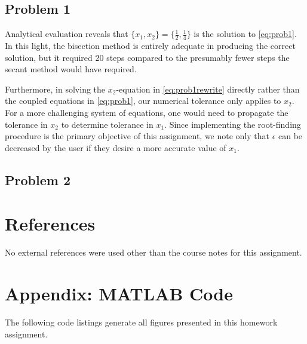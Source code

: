 \documentclass[12pt]{article}
\begin{document}
\subsection{Problem 1}

Analytical evaluation reveals that $\{ x_1, x_2 \} = \{ \tfrac{1}{2}, \tfrac{1}{4} \}$ is the solution to \eqref{eq:prob1}. In this light, the bisection method is entirely adequate in producing the correct solution, but it required 20 steps compared to the presumably fewer steps the secant method would have required.

Furthermore, in solving the $x_2$-equation in \eqref{eq:prob1rewrite} directly rather than the coupled equations in \eqref{eq:prob1}, our numerical tolerance only applies to $x_2$. For a more challenging system of equations, one would need to propagate the tolerance in $x_2$ to determine tolerance in $x_1$. Since implementing the root-finding procedure is the primary objective of this assignment, we note only that $\epsilon$ can be decreased by the user if they desire a more accurate value of $x_1$.

\subsection{Problem 2}

\section{References} %

No external references were used other than the course notes for this assignment.

\section*{Appendix: MATLAB Code} %

The following code listings generate all figures presented in this homework assignment.


\end{document}
